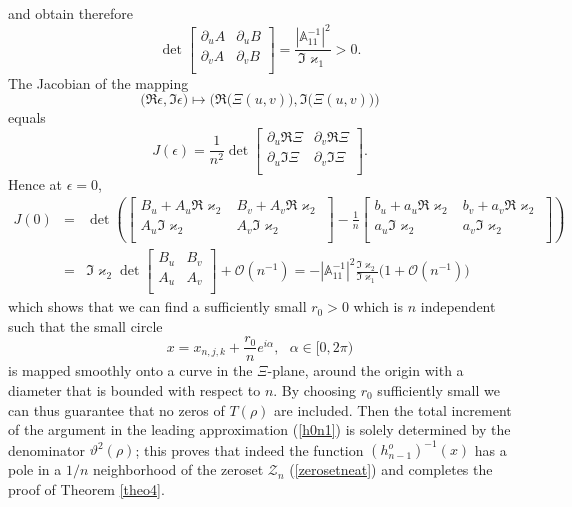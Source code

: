 \documentclass[10pt,oneside,reqno]{amsart}
\numberwithin{equation}{section}
\def\eqref#1{(\ref{#1})}
\begin{document}
and obtain therefore
\begin{equation*}
	\det\begin{bmatrix}
	\partial_uA &\partial_uB\\
	\partial_vA &\partial_vB\\
	\end{bmatrix}=\frac{|\mathbb{A}_{11}^{-1}|^2}{\Im\varkappa_1}> 0.
\end{equation*}
The Jacobian of the mapping
\begin{equation*}
	\big(\Re\epsilon,\Im\epsilon\big)\mapsto\Big(\Re\big(\Xi(u,v)\big),\Im\big(\Xi(u,v)\big)\Big)
\end{equation*}
equals
\begin{equation*}
	J(\epsilon)=\frac{1}{n^2}\det\begin{bmatrix}
	\partial_u\Re\Xi &\partial_v\Re\Xi\\
	\partial_u\Im\Xi &\partial_v\Im\Xi\\
	\end{bmatrix}.
\end{equation*}
Hence at $\epsilon=0$,
\begin{eqnarray*}
	J(0)&=&\det\left(\begin{bmatrix}
	B_u+A_u\Re\varkappa_2 & B_v+A_v\Re\varkappa_2\\
	A_u\Im\varkappa_2 & A_v\Im\varkappa_2\\
	\end{bmatrix}-\frac{1}{n}\begin{bmatrix}
	b_u+a_u\Re\varkappa_2 & b_v+a_v\Re\varkappa_2\\
	a_u\Im\varkappa_2 & a_v\Im\varkappa_2\\
	\end{bmatrix}
	\right)\\
	&=&\Im\varkappa_2\det\begin{bmatrix}
	B_u& B_v\\
	A_u&A_v\\
	\end{bmatrix}+\mathcal O\left(n^{-1}\right)=-|\mathbb{A}_{11}^{-1}|^2\frac{\Im\varkappa_2}{\Im\varkappa_1}\big(1+\mathcal O\left(n^{-1}\right)\big)
\end{eqnarray*}
which shows that we can find a sufficiently small $r_0>0$ which is $n$ independent such that the small circle
\begin{equation*}
	x=x_{n,j,k}+\frac{r_0}{n}e^{i\alpha},\ \ \ \alpha\in[0,2\pi)
\end{equation*}
is mapped smoothly onto a curve in the $\Xi$-plane, around the origin with a diameter that is bounded with respect to $n$. By choosing $r_0$ sufficiently small we can thus guarantee that no zeros of $T(\rho)$ are included. 
Then the total increment of the argument in the leading approximation \eqref{h0n1} is solely determined by the denominator $\vartheta^2(\rho)$; this proves that indeed the function $(h^o_{n-1})^{-1}(x)$ has a pole in a $1/n$ neighborhood of  the zeroset $\mathcal Z_n$ \eqref{zerosetneat} and completes the proof of Theorem \ref{theo4}.
\end{document}
